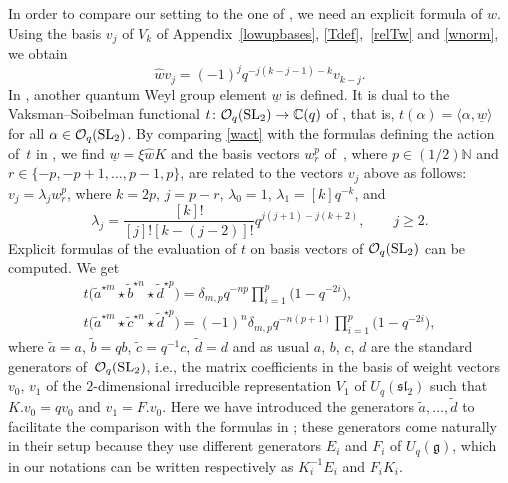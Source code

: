 \documentclass[pdftex]{sigma}
\numberwithin{equation}{section}
\theoremstyle{definition}
\newcommand{\mc}{\mathbb{C}}
\newcommand{\mn}{\mathbb{N}}
\newcommand{\Oo}{{\mathcal O}}
\newcommand{\ra}{\rightarrow}
\begin{document}
In order to compare our setting to the one of \cite{DC-L}, we need an explicit formula of $\hat{w}$.
Using the basis $v_j$ of $V_k$ of Appendix~\ref{lowupbases}, \eqref{Tdef},~\eqref{relTw} and \eqref{wnorm}, we obtain
\begin{equation}\label{wact}
\hat{w}{v}_j=(-1)^j q^{-j(k-j-1)-k}{v}_{k-j}.
\end{equation}
In \cite{DC-L}, another quantum Weyl group element $\underline{w}$ is defined. It is dual to the Vaksman--Soibelman functional $t\colon \Oo_q({\rm SL}_2)\ra \mc(q)$ of \cite{Soi,SV}, that is, $t(\alpha)=\langle \alpha , \underline{w} \rangle$ for all $\alpha \in \Oo_q({\rm SL}_2)$. By comparing \eqref{wact} with the formulas defining the action of~$t$ in \cite[Section~1.7]{DC-L}, we find $\underline{w}=\xi \hat{w}K$ and the basis vectors $w_r^p$ of~\cite{DC-L}, where $p\in (1/2)\mn$ and $r\in\{-p,-p+1,\dots,p-1,p\}$, are related to the vectors $v_j$ above as follows:
${v}_j=\lambda_j w_r^p$,
where $k=2p$, $j=p-r$, $\lambda_0=1$, $\lambda_1=[k]q^{-k}$, and
\[\lambda_j=\frac{[k]!}{[j]![k-(j-2)]!}q^{j(j+1)-j(k+2)}, \qquad j\geq 2.\]
Explicit formulas of the evaluation of $t$ on basis vectors of $\Oo_q({\rm SL}_2)$ can be computed. We get%
\begin{gather}
 t\big(\tilde{a}^{\star m}\star \tilde{b}^{\star n}\star \tilde{d}^{\star p}\big)=\delta_{m,p}q^{-np}\prod_{i=1}^{p}\big(1-q^{-2i}\big),\label{tform1}\\
 t\big(\tilde{a}^{\star m}\star \tilde{c}^{\star n}\star \tilde{d}^{\star p}\big)=(-1)^n\delta_{m,p}q^{-n(p+1)}\prod_{i=1}^{p}\big(1-q^{-2i}\big)\label{tform2},
\end{gather}
where $
\tilde{a} = a$, $\tilde{b} = q b$, $\tilde{c} = q^{-1}c$, $\tilde{d}=d$ and as usual $a$, $b$, $c$, $d$ are the standard generators of~$\mathcal{O}_q({\rm SL}_2)$, i.e., the matrix coefficients in the basis of weight vectors $v_0$, $v_1$ of the $2$-dimensional irreducible representation $V_1$ of $U_q({\mathfrak{sl}_2})$ such that $K.v_0=qv_0$ and $v_1=F.v_0$. Here we have introduced the generators $\tilde{a},\dots , \tilde{d}$ to facilitate the comparison with the formulas in \cite{DC-L}; these generators come naturally in their setup because they use different generators $E_i$ and $F_i$ of $U_q(\mathfrak{g})$, which in our notations can be written respectively as $K_i^{-1}E_i$ and $F_iK_i$.
\end{document}
